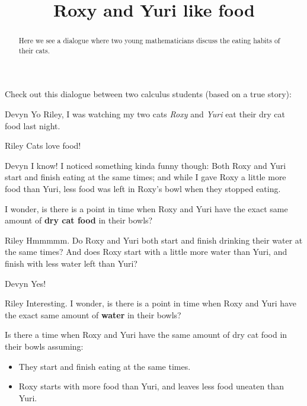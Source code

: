 \documentclass{ximera}
\title[Break-Ground:]{Roxy and Yuri like food}
\begin{document}
\begin{abstract}
Here we see a dialogue where two young mathematicians discuss the eating
habits of their cats.
\end{abstract}
\maketitle

Check out this dialogue between two calculus students (based on a true
story):

\begin{dialogue}
\item[Devyn] Yo Riley, I was watching my two cats
  \textit{Roxy} and \textit{Yuri} eat their dry cat food last night.
\item[Riley] Cats love food!
\item[Devyn] I know! I noticed something kinda funny though:
  Both Roxy and Yuri start and finish eating at the same times; and
  while I gave Roxy a little more food than Yuri, less food was left
  in Roxy's bowl when they stopped eating.

  I wonder, is there is a point in time when Roxy and Yuri have the
  exact same amount of \textbf{dry cat food} in their bowls?
\item[Riley] Hmmmmm. Do Roxy and Yuri both start and finish
  drinking their water at the same times?  And does Roxy start with a
  little more water than Yuri, and finish with less water left than
  Yuri?
\item[Devyn] Yes!
\item[Riley] Interesting. I wonder, is there is a point in
  time when Roxy and Yuri have the exact same amount of \textbf{water}
  in their bowls?
\end{dialogue}

\begin{problem}
  Is there a time when Roxy and Yuri have the same amount of dry cat
  food in their bowls assuming:
  \begin{itemize}
  \item They start and finish eating at the same times.
  \item Roxy starts with more food than Yuri, and leaves less food uneaten than Yuri. 
  \end{itemize}
  \begin{multipleChoice}
  \end{multipleChoice}
\end{problem}
\end{document}
